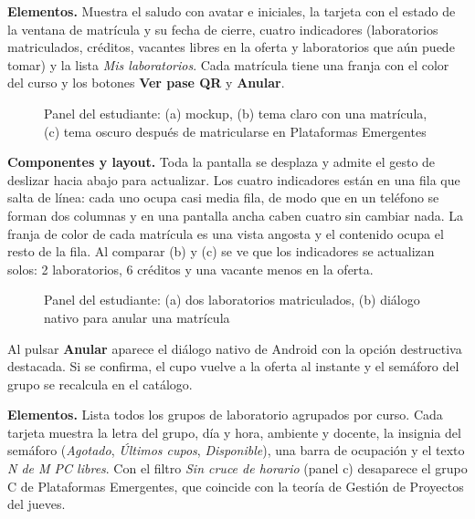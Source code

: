 
\textbf{Elementos.} Muestra el saludo con avatar e iniciales, la tarjeta con el estado de la ventana de matrícula y su fecha de cierre, cuatro indicadores (laboratorios matriculados, créditos, vacantes libres en la oferta y laboratorios que aún puede tomar) y la lista \textit{Mis laboratorios}. Cada matrícula tiene una franja con el color del curso y los botones \textbf{Ver pase QR} y \textbf{Anular}.

\begin{figure}[!htbp]
\centering
{}
\caption{Panel del estudiante: (a) mockup, (b) tema claro con una matrícula, (c) tema oscuro después de matricularse en Plataformas Emergentes}
\label{fig:i02}
\end{figure}

\textbf{Componentes y layout.} Toda la pantalla se desplaza y admite el gesto de deslizar hacia abajo para actualizar. Los cuatro indicadores están en una fila que salta de línea: cada uno ocupa casi media fila, de modo que en un teléfono se forman dos columnas y en una pantalla ancha caben cuatro sin cambiar nada. La franja de color de cada matrícula es una vista angosta y el contenido ocupa el resto de la fila. Al comparar (b) y (c) se ve que los indicadores se actualizan solos: 2 laboratorios, 6 créditos y una vacante menos en la oferta.

\begin{figure}[!htbp]
\centering
{}
\caption{Panel del estudiante: (a) dos laboratorios matriculados, (b) diálogo nativo para anular una matrícula}
\label{fig:x02}
\end{figure}

Al pulsar \textbf{Anular} aparece el diálogo nativo de Android con la opción destructiva destacada. Si se confirma, el cupo vuelve a la oferta al instante y el semáforo del grupo se recalcula en el catálogo.


\textbf{Elementos.} Lista todos los grupos de laboratorio agrupados por curso. Cada tarjeta muestra la letra del grupo, día y hora, ambiente y docente, la insignia del semáforo (\textit{Agotado}, \textit{Últimos cupos}, \textit{Disponible}), una barra de ocupación y el texto \textit{N de M PC libres}. Con el filtro \textit{Sin cruce de horario} (panel c) desaparece el grupo C de Plataformas Emergentes, que coincide con la teoría de Gestión de Proyectos del jueves.

